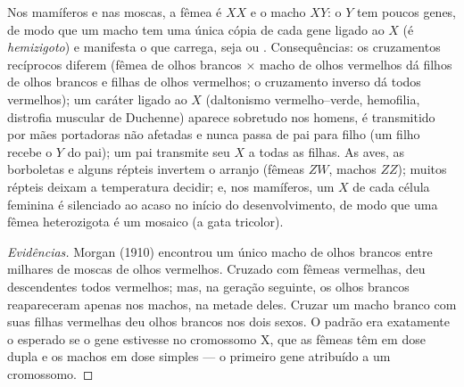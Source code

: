 \begin{proposition}\label{prop:b2:meiosis-heredity:sexlinked}
Nos mamíferos e nas moscas, a fêmea é $XX$ e o macho $XY$: o $Y$ tem
poucos genes, de modo que um macho tem uma única cópia de cada gene
ligado ao $X$ (é \emph{hemizigoto}) e manifesta o  que carrega,
seja  ou . Consequências: os cruzamentos recíprocos
diferem (fêmea de olhos brancos $\times$ macho de olhos vermelhos dá
filhos de olhos brancos e filhas de olhos vermelhos; o cruzamento
inverso dá todos vermelhos); um caráter  ligado ao $X$
(daltonismo vermelho--verde, hemofilia, distrofia muscular de
Duchenne) aparece sobretudo nos homens, é transmitido por mães
portadoras não afetadas e nunca passa de pai para filho (um filho
recebe o $Y$ do pai); um pai transmite seu $X$ a todas as filhas. As
aves, as borboletas e alguns répteis invertem o arranjo (fêmeas $ZW$,
machos $ZZ$); muitos répteis deixam a temperatura decidir; e, nos
mamíferos, um $X$ de cada célula feminina é silenciado ao acaso no
início do desenvolvimento, de modo que uma fêmea heterozigota é um
mosaico (a gata tricolor).
\end{proposition}
\begin{proof}[Evidências]
Morgan (1910) encontrou um único macho de olhos brancos entre milhares
de moscas de olhos vermelhos. Cruzado com fêmeas vermelhas, deu
descendentes todos vermelhos; mas, na geração seguinte, os olhos
brancos reapareceram apenas nos machos, na metade deles. Cruzar um
macho branco com suas filhas vermelhas deu olhos brancos nos dois
sexos. O padrão era exatamente o esperado se o gene estivesse no
cromossomo X, que as fêmeas têm em dose dupla e os machos em dose
simples --- o primeiro gene atribuído a um cromossomo.
\end{proof}

